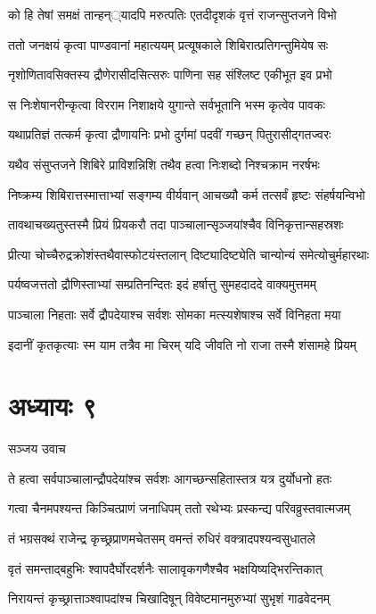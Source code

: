 \twolineshloka
{को हि तेषां समक्षं तान्हन््यादपि मरुत्पतिः}
{एतदीदृशकं वृत्तं राजन्सुप्तजने विभो}


\twolineshloka
{ततो जनक्षयं कृत्वा पाण्डवानां महात्ययम्}
{प्रत्यूषकाले शिबिरात्प्रतिगन्तुमियेष सः}


\twolineshloka
{नृशोणितावसिक्तस्य द्रौणेरासीदसित्सरुः}
{पाणिना सह संश्लिष्ट एकीभूत इव प्रभो}


\twolineshloka
{स निःशेषानरीन्कृत्वा विरराम निशाक्षये}
{युगान्ते सर्वभूतानि भस्म कृत्वेव पावकः}


\twolineshloka
{यथाप्रतिज्ञं तत्कर्म कृत्वा द्रौणायनिः प्रभो}
{दुर्गमां पदवीं गच्छन् पितुरासीद्गतज्वरः}


\twolineshloka
{यथैव संसुप्तजने शिबिरे प्राविशन्निशि}
{तथैव हत्वा निःशब्दो निश्चक्राम नरर्षभः}


\twolineshloka
{निष्क्रम्य शिबिरात्तस्मात्ताभ्यां सङ्गम्य वीर्यवान्}
{आचख्यौ कर्म तत्सर्वं हृष्टः संहर्षयन्विभो}


\twolineshloka
{तावथाचख्यतुस्तस्मै प्रियं प्रियकरौ तदा}
{पाञ्चालान्सृञ्जयांश्चैव विनिकृत्तान्सहस्रशः}


\twolineshloka
{प्रीत्या चोच्चैरुद्रक्रोशंस्तथैवास्फोटयंस्तलान्}
{दिष्ट्यादिष्ट्येति चान्योन्यं समेत्योचुर्महारथाः}


\twolineshloka
{पर्यष्वजत्ततो द्रौणिस्ताभ्यां सम्प्रतिनन्दितः}
{इदं हर्षात्तु सुमहदाददे वाक्यमुत्तमम्}


\twolineshloka
{पाञ्चाला निहताः सर्वे द्रौपदेयाश्च सर्वशः}
{सोमका मत्स्यशेषाश्च सर्वे विनिहता मया}


\twolineshloka
{इदानीं कृतकृत्याः स्म याम तत्रैव मा चिरम्}
{यदि जीवति नो राजा तस्मै शंसामहे प्रियम्}


\chapter{अध्यायः ९}
\twolineshloka
{सञ्जय उवाच}
{}


\twolineshloka
{ते हत्वा सर्वपाञ्चालान्द्रौपदेयांश्च सर्वशः}
{आगच्छन्सहितास्तत्र यत्र दुर्योधनो हतः}


\twolineshloka
{गत्वा चैनमपश्यन्त किञ्चित्प्राणं जनाधिपम्}
{ततो रथेभ्यः प्रस्कन्द्य परिवव्रुस्तवात्मजम्}


\twolineshloka
{तं भग्रसक्थं राजेन्द्र कृच्छ्रप्राणमचेतसम्}
{वमन्तं रुधिरं वक्त्रादपश्यन्वसुधातले}


\twolineshloka
{वृतं समन्ताद्बहुभिः श्वापदैर्घोरदर्शनैः}
{सालावृकगणैश्चैव भक्षयिष्यद्भिरन्तिकात्}


\twolineshloka
{निरायन्तं कृच्छ्रात्ताञ्श्वापदांश्च चिखादिषून्}
{विवेष्टमानमुरुभ्यां सुभृशं गाढवेदनम्}


